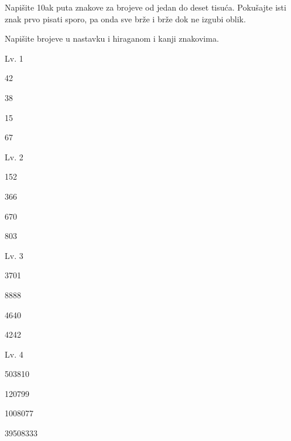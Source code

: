 
\author{Tomislav Mamić}

	
	\vspace{15pt}
	\noindent Napišite 10ak puta znakove za brojeve od jedan do deset tisuća. Pokušajte isti znak prvo pisati sporo, pa onda sve brže i brže dok ne izgubi oblik.
	
	\vspace{15pt}
	\noindent Napišite brojeve u nastavku i hiraganom i kanji znakovima.
	
	\begin{mondai}{Lv. 1}
		\item 42
		\item 38
		\item 15
		\item 67
	\end{mondai}

	\begin{mondai}{Lv. 2}
		\item 152
		\item 366
		\item 670
		\item 803
	\end{mondai}

	\begin{mondai}{Lv. 3}
		\item 3701
		\item 8888
		\item 4640
		\item 4242
	\end{mondai}

	\begin{mondai}{Lv. 4}
		\item 503810
		\item 120799
		\item 1008077
		\item 39508333
	\end{mondai}
